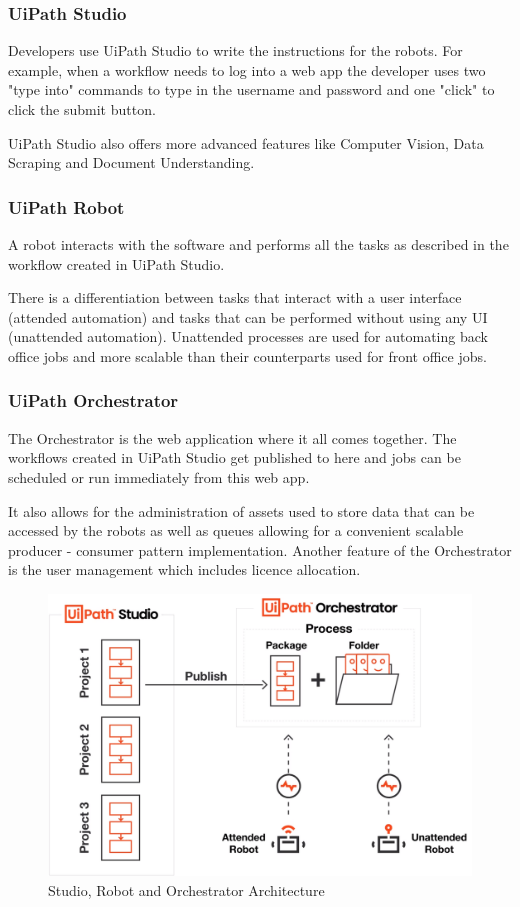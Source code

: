 \subsubsection{UiPath Studio}
Developers use UiPath Studio to write the instructions for the robots. For example, when a workflow needs to log into a web app the developer uses two "type into" commands to type in the username and password and one "click" to click the submit button. 

UiPath Studio also offers more advanced features like Computer Vision, Data Scraping and Document Understanding.

\subsubsection{UiPath Robot}
A robot interacts with the software and performs all the tasks as described in the workflow created in UiPath Studio.

There is a differentiation between tasks that interact with a user interface (attended automation) and tasks that can be performed without using any UI (unattended automation). 
Unattended processes are used for automating back office jobs and more scalable than their counterparts used for front office jobs.

\subsubsection{UiPath Orchestrator}
The Orchestrator is the web application where it all comes together. The workflows created in UiPath Studio get published to here and jobs can be scheduled or run immediately from this web app.

It also allows for the administration of assets used to store data that can be accessed by the robots as well as queues allowing for a convenient scalable producer - consumer pattern implementation. Another feature of the Orchestrator is the user management which includes licence allocation.

\begin{figure}
    \centering
    \includegraphics[scale=0.4]{pics/UiPathArchitecture.png}
    \caption{Studio, Robot and Orchestrator Architecture}
    \label{fig:as:UiPathArchitecture}
\end{figure}

